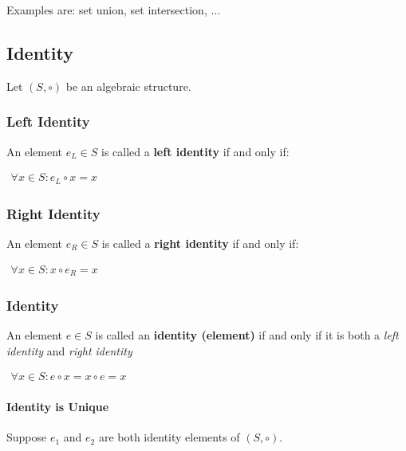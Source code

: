 Examples are: set union, set intersection, ...



\subsection{Identity}
Let $(S, \circ)$ be an algebraic structure.


\subsubsection{Left Identity}
An element $e_L \in S$ is called a \textbf{left identity} if and only
if:

\begin{math}
  \begin{array}{c}
    \forall x \in S: e_L \circ x = x
  \end{array}
\end{math}

\subsubsection{Right Identity}
An element $e_R \in S$ is called a \textbf{right identity} if and only
if:

\begin{math}
  \begin{array}{c}
    \forall x \in S: x \circ e_R = x
  \end{array}
\end{math}


\subsubsection{Identity}
An element $e \in S$ is called an \textbf{identity (element)} if and
only if it is both a \textit{left identity} and \textit{right
  identity}

\begin{math}
  \begin{array}{c}
    \forall x \in S: e \circ x = x \circ e =  x
  \end{array}
\end{math}


\paragraph{Identity is Unique}

Suppose $e_1$ and $e_2$ are both identity elements of $(S, \circ)$.

